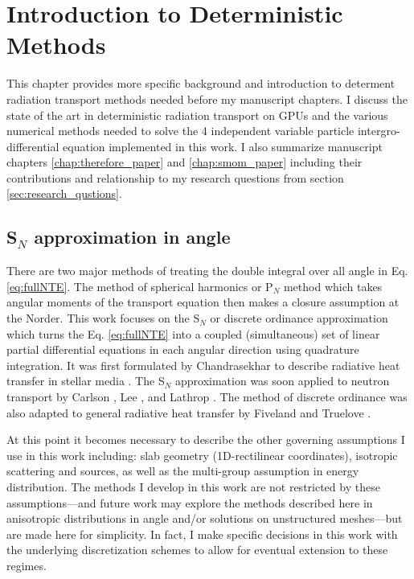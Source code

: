 \chapter{Introduction to Deterministic Methods}
\label{chap:determ_intro}


This chapter provides more specific background and introduction to determent radiation transport methods needed before my manuscript chapters.
I discuss the state of the art in deterministic radiation transport on GPUs and the various numerical methods needed to solve the 4 independent variable particle intergro-differential equation implemented in this work.
I also summarize manuscript chapters \ref{chap:therefore_paper} and \ref{chap:smom_paper} including their contributions and relationship to my research questions from section \ref{sec:research_qustions}.

\section{S$_N$ approximation in angle}

There are two major methods of treating the double integral over all angle in Eq. \ref{eq:fullNTE}.
The method of spherical harmonics or P$_{N}$ method which takes angular moments of the transport equation then makes a closure assumption at the N\ths  order.
This work focuses on the S$_N$ or discrete ordinance approximation which turns the Eq. \ref{eq:fullNTE} into a coupled (simultaneous) set of linear partial differential equations in each angular direction using quadrature integration.
It was first formulated by Chandrasekhar to describe radiative heat transfer in stellar media \cite{chandrasekhar1960radiative}.
The S$_N$ approximation was soon applied to neutron transport by Carlson \cite{precise1971carlson}, Lee \cite{discrete1961lee}, and Lathrop \cite{discrete1966lathnrop}.
The method of discrete ordinance was also adapted to general radiative heat transfer by Fiveland \cite{three1988fiveland} and Truelove \cite{discrete1987truelove}.

At this point it becomes necessary to describe the other governing assumptions I use in this work including:
slab geometry (1D-rectilinear coordinates), isotropic scattering and sources, as well as the multi-group assumption in energy distribution.
The methods I develop in this work are not restricted by these assumptions---and future work may explore the methods described here in anisotropic distributions in angle and/or solutions on unstructured meshes---but are made here for simplicity.
In fact, I make specific decisions in this work with the underlying discretization schemes to allow for eventual extension to these regimes.

